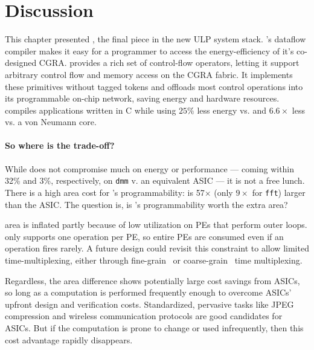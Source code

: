 \section{Discussion}
\label{riptide:discuss}
This chapter presented \riptide, the final piece in the new ULP system stack.
% 
\riptide's dataflow compiler makes it easy for a programmer to access the energy-efficiency of it's co-designed CGRA.
% 
\riptide provides a rich set of control-flow operators, letting it support arbitrary control flow and memory access on the CGRA fabric. 
% 
It implements these primitives without tagged tokens and offloads most control operations into its programmable on-chip network, saving energy and hardware resources.
% 
\riptide compiles applications written in C while using $25\%$ less energy vs. \snafu and $6.6\times$ less vs. a von Neumann core.

% 
% 
\paragraph{So where is the trade-off?}
While \riptide does not compromise much on energy or performance --- coming within 32\% and 3\%, respectively, on {\tt dmm} v. an equivalent ASIC --- it is not a free lunch.
%
There is a high area cost for \riptide's programmability: \riptide is 57$\times$ (only $9\times$ for {\tt fft}) larger than the ASIC.
%
The question is, is \riptide's programmability worth the extra area?

\riptide area is inflated partly because of low utilization on PEs that perform outer loops.
%
\riptide only supports one operation per PE, so entire PEs are consumed even if an operation fires rarely.
%
A future design could revisit this constraint to allow limited time-multiplexing,
either through fine-grain~\cite{weng2020hybrid} or coarse-grain~\cite{nguyen2021fifer} time multiplexing.

Regardless, the area difference shows potentially large cost savings from ASICs,
so long as a computation is performed frequently enough to overcome
ASICs' upfront design and verification costs.
%
Standardized, pervasive tasks like JPEG compression and wireless communication protocols are good candidates for ASICs.
%
But if the computation is prone to change
or used infrequently, then this cost advantage rapidly disappears.


